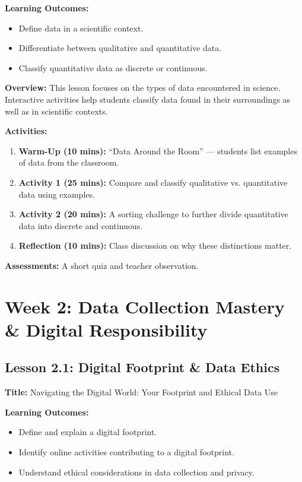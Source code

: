 \documentclass{tufte-book}
\begin{document}
\medskip
\textbf{Learning Outcomes:}
\begin{itemize}[leftmargin=*, label={\textbullet}]
    \item Define data in a scientific context.
    \item Differentiate between qualitative and quantitative data.
    \item Classify quantitative data as discrete or continuous.
\end{itemize}

\medskip
\textbf{Overview:}  
This lesson focuses on the types of data encountered in science. Interactive activities help students classify data found in their surroundings as well as in scientific contexts.

\medskip
\textbf{Activities:}
\begin{enumerate}[label=\arabic*.]
    \item \textbf{Warm-Up (10 mins):} “Data Around the Room” — students list examples of data from the classroom.
    \item \textbf{Activity 1 (25 mins):} Compare and classify qualitative vs. quantitative data using examples.
    \item \textbf{Activity 2 (20 mins):} A sorting challenge to further divide quantitative data into discrete and continuous.
    \item \textbf{Reflection (10 mins):} Class discussion on why these distinctions matter.
\end{enumerate}

\medskip
\textbf{Assessments:}  
A short quiz and teacher observation.

\section{Week 2: Data Collection Mastery \& Digital Responsibility}

\subsection{Lesson 2.1: Digital Footprint \& Data Ethics}
\textbf{Title:} Navigating the Digital World: Your Footprint and Ethical Data Use

\medskip
\textbf{Learning Outcomes:}
\begin{itemize}[leftmargin=*, label={\textbullet}]
    \item Define and explain a digital footprint.
    \item Identify online activities contributing to a digital footprint.
    \item Understand ethical considerations in data collection and privacy.
\end{itemize}
\end{document}
